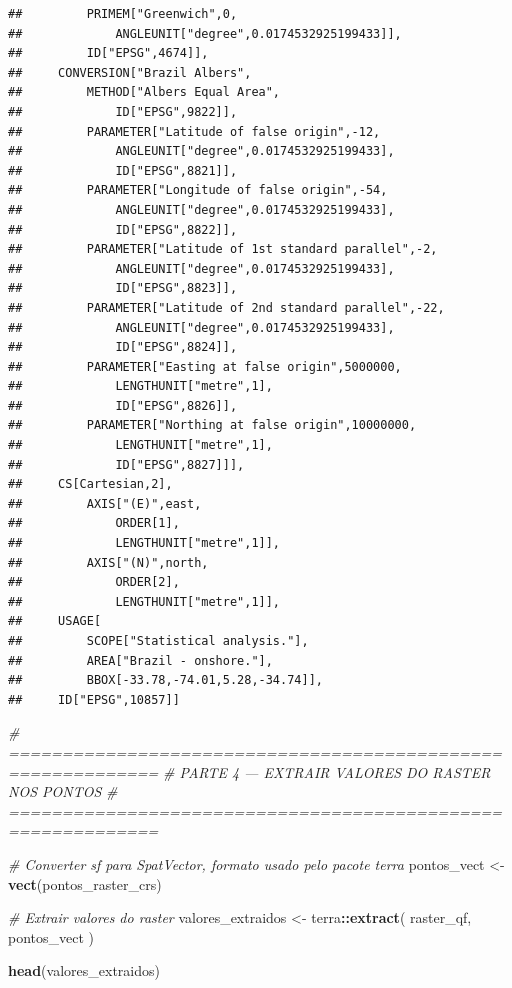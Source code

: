 \documentclass[
]{article}
\newenvironment{Shaded}{\begin{snugshade}}{\end{snugshade}}
\newcommand{\CommentTok}[1]{\textcolor[rgb]{0.56,0.35,0.01}{\textit{#1}}}
\newcommand{\FunctionTok}[1]{\textcolor[rgb]{0.13,0.29,0.53}{\textbf{#1}}}
\newcommand{\NormalTok}[1]{#1}
\newcommand{\OtherTok}[1]{\textcolor[rgb]{0.56,0.35,0.01}{#1}}
\newcommand{\SpecialCharTok}[1]{\textcolor[rgb]{0.81,0.36,0.00}{\textbf{#1}}}
\begin{document}
\begin{verbatim}
##         PRIMEM["Greenwich",0,
##             ANGLEUNIT["degree",0.0174532925199433]],
##         ID["EPSG",4674]],
##     CONVERSION["Brazil Albers",
##         METHOD["Albers Equal Area",
##             ID["EPSG",9822]],
##         PARAMETER["Latitude of false origin",-12,
##             ANGLEUNIT["degree",0.0174532925199433],
##             ID["EPSG",8821]],
##         PARAMETER["Longitude of false origin",-54,
##             ANGLEUNIT["degree",0.0174532925199433],
##             ID["EPSG",8822]],
##         PARAMETER["Latitude of 1st standard parallel",-2,
##             ANGLEUNIT["degree",0.0174532925199433],
##             ID["EPSG",8823]],
##         PARAMETER["Latitude of 2nd standard parallel",-22,
##             ANGLEUNIT["degree",0.0174532925199433],
##             ID["EPSG",8824]],
##         PARAMETER["Easting at false origin",5000000,
##             LENGTHUNIT["metre",1],
##             ID["EPSG",8826]],
##         PARAMETER["Northing at false origin",10000000,
##             LENGTHUNIT["metre",1],
##             ID["EPSG",8827]]],
##     CS[Cartesian,2],
##         AXIS["(E)",east,
##             ORDER[1],
##             LENGTHUNIT["metre",1]],
##         AXIS["(N)",north,
##             ORDER[2],
##             LENGTHUNIT["metre",1]],
##     USAGE[
##         SCOPE["Statistical analysis."],
##         AREA["Brazil - onshore."],
##         BBOX[-33.78,-74.01,5.28,-34.74]],
##     ID["EPSG",10857]]
\end{verbatim}

\begin{Shaded}
\begin{Highlighting}[]
\CommentTok{\# ============================================================}
\CommentTok{\# PARTE 4 — EXTRAIR VALORES DO RASTER NOS PONTOS}
\CommentTok{\# ============================================================}

\CommentTok{\# Converter sf para SpatVector, formato usado pelo pacote terra}
\NormalTok{pontos\_vect }\OtherTok{\textless{}{-}} \FunctionTok{vect}\NormalTok{(pontos\_raster\_crs)}

\CommentTok{\# Extrair valores do raster}
\NormalTok{valores\_extraidos }\OtherTok{\textless{}{-}}\NormalTok{ terra}\SpecialCharTok{::}\FunctionTok{extract}\NormalTok{(}
\NormalTok{  raster\_qf,}
\NormalTok{  pontos\_vect}
\NormalTok{)}

\FunctionTok{head}\NormalTok{(valores\_extraidos)}
\end{Highlighting}
\end{Shaded}
\end{document}
